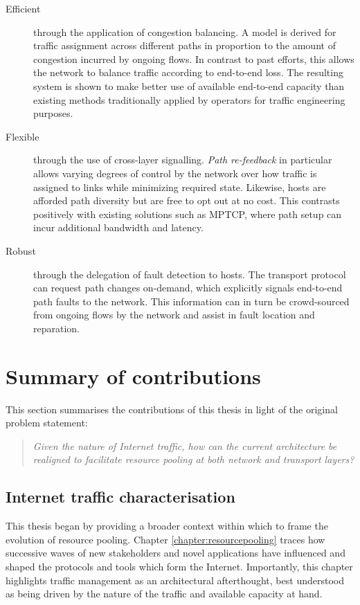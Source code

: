 \renewcommand{\descriptionlabel}[1]{\hspace{\labelsep}\textbf{#1}}
\begin{description}
\item[Efficient] through the application of congestion balancing. 
A model is derived for traffic assignment across different paths in proportion to the amount of congestion incurred by ongoing flows. 
In contrast to past efforts, this allows the network to balance traffic according to end-to-end loss. 
The resulting system is shown to make better use of available end-to-end capacity than existing methods traditionally applied by operators for traffic engineering purposes.
\item[Flexible] through the use of cross-layer signalling. 
\emph{Path re-feedback} in particular allows varying degrees of control by the network over how traffic is assigned to links while minimizing required state. Likewise, hosts are afforded path diversity but are free to opt out at no cost. 
This contrasts positively with existing solutions such as \ac{MPTCP}, where path setup can incur additional bandwidth and latency.
\item[Robust] through the delegation of fault detection to hosts. 
The transport protocol can request path changes on-demand, which explicitly signals end-to-end path faults to the network. 
This information can in turn be crowd-sourced from ongoing flows by the network and assist in fault location and reparation.
\end{description}


\section{Summary of contributions}

This section summarises the contributions of this thesis in light of the original problem statement:

\begin{quote}
\textit{
Given the nature of Internet traffic, how can the current architecture be realigned to facilitate resource pooling at both network and transport layers?
}
\end{quote}

\subsection{Internet traffic characterisation}

This thesis began by providing a broader context within which to frame the evolution of resource pooling.
Chapter \ref{chapter:resourcepooling} traces how successive waves of new stakeholders and novel applications have influenced and shaped the protocols and tools which form the Internet.
Importantly, this chapter highlights traffic management as an architectural afterthought, best understood as being driven by the nature of the traffic and available capacity at hand.

